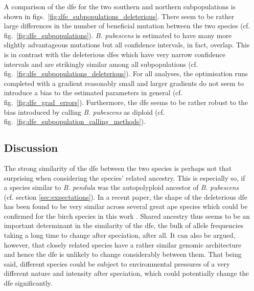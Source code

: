 \documentclass[hidelinks,11pt]{article}
\newcommand{\pendula}{\textit{B. pendula}}
\newcommand{\pubescens}{\textit{B. pubescens}}
\begin{document}
    A comparison of the \acrshort{dfe} for the two southern and northern subpopulations is shown in figs.~\ref{fig:dfe_subpopulations_deleterious}. There seem to be rather large differences in the number of beneficial mutation between the two species (cf. fig.~\ref{fig:dfe_subpopulations}). \pubescens{} is estimated to have many more slightly advantageous mutations but all confidence intervals, in fact, overlap. This is in contrast with the deleterious \acrshort{dfe}s which have very narrow confidence intervals and are strikingly similar among all subpopulations (cf. fig.~\ref{fig:dfe_subpopulations_deleterious}). For all analyses, the optimisation runs completed with a gradient reasonably small and larger gradients do not seem to introduce a bias to the estimated parameters in general (cf. fig.~\ref{fig:dfe_grad_errors}). Furthermore, the \acrshort{dfe} seems to be rather robust to the bias introduced by calling \pubescens{} as diploid (cf. fig.~\ref{fig:dfe_subpopulation_calling_methods}).

    \subsection{Discussion}

    The strong similarity of the \acrshort{dfe} between the two species is perhaps not that surprising when considering the species' related ancestry. This is especially so, if a species similar to \pendula{} was the autopolyploid ancestor of \pubescens{} (cf. section \ref{sec:expectations}). In a recent paper, the shape of the deleterious \acrshort{dfe} has been found to be very similar across several great ape species  which could be confirmed for the birch species in this work \cite{dfe-similarity-across-species}. Shared ancestry thus seems to be an important determinant in the similarity of the \acrshort{dfe}, the bulk of allele frequencies taking a long time to change after speciation, after all. It can also be argued, however, that closely related species have a rather similar genomic architecture and hence the \acrshort{dfe} is unlikely to change considerably between them. That being said, different species could be subject to environmental pressures of a very different nature and intensity after speciation, which could potentially change the \acrshort{dfe} significantly.
\end{document}
